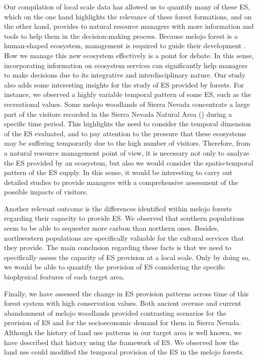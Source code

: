 Our compilation of local scale data has allowed us to quantify many of these ES, which on the one hand highlights the relevance of these forest formations, and on the other hand, provides to natural resource managers with more information and tools to help them in the decision-making process. Because melojo forest is a human-shaped ecosystem, management is required to guide their development \autocite{Hobbsetal2006NovelEcosystems}. How we manage this new ecosystem effectively is a point for debate. In this sense, incorporating information on ecosystem services can significantly help managers to make decisions due to its integrative and interdisciplinary nature. Our study also adds some interesting insights for the study of ES provided by forests. For instance, we observed a highly variable temporal pattern of some ES, such as the recreational values. Some melojo woodlands of Sierra Nevada concentrate a large part of the visitors recorded in the Sierra Nevada Natural Area () during a specific time period. This highlights the need to consider the temporal dimension of the ES evaluated, and to pay attention to the pressure that these ecosystems may be suffering temporarily due to the high number of visitors. Therefore, from a natural resource management point of view, it is necessary not only to analyze the ES provided by an ecosystem, but also we would consider the spatio-temporal pattern of the ES supply. In this sense, it would be interesting to carry out detailed studies to provide managers with a comprehensive assessment of the possible impacts of visitors.

Another relevant outcome is the differences identified within melojo forests regarding their capacity to provide ES. We observed that southern populations seem to be able to sequester more carbon than northern ones. Besides, northwestern populations are specifically valuable for the cultural services that they provide. The main conclusion regarding these facts is that we need to specifically assess the capacity of ES provision at a local scale. Only by doing so, we would be able to quantify the provision of ES considering the specific biophysical features of each target area. 

Finally, we have assessed the change in ES provision patterns across time of this forest system with high conservation values. Both ancient overuse and current abandonment of melojo woodlands provided contrasting scenarios for the provision of ES and for the socioeconomic demand for them in Sierra Nevada. Although the history of land use patterns in our target area is well known, we have described that history using the framework of ES. We observed how the land use could modified the temporal provision of the ES in the melojo forests.

